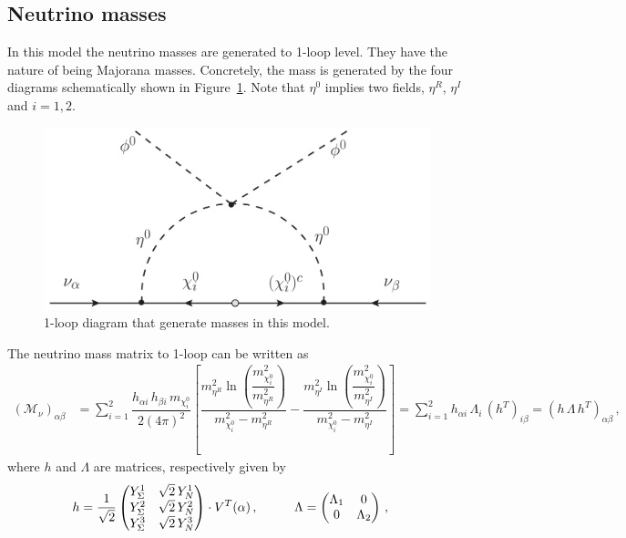 \documentclass[12pt,letterpaper]{article}
\begin{document}
   






\subsection{Neutrino masses}
\label{sec:neutrino-masses}

In this model the neutrino masses are generated to 1-loop level. They have the nature of being Majorana masses. Concretely, the mass is generated by the four diagrams schematically shown in Figure~\ref{fig:mass-diagram}. Note that $\eta^0$ implies two fields, $\eta^R$, $\eta^I$ and $i=1,2$.
%
\begin{figure}
\begin{center}
\includegraphics[scale=0.4]{mass-diagram}
\caption{1-loop diagram that generate masses in this model. }
\label{fig:mass-diagram}
\end{center}
\end{figure}
%
The neutrino mass matrix to 1-loop can be written as
%
\begin{align}
\label{eq:Mv-mass-matrix}
(\mathcal{M}_\nu)_{\alpha\beta} &= \sum_{i=1}^2\dfrac{h_{\alpha i}\,h_{\beta i}\,m_{\chi_i^0}}{2(4\pi)^2}
\left[
\dfrac{m_{\eta^R}^2\ln\left(\dfrac{m_{\chi_i^0}^2}{m_{\eta^R}^2}\right)}{m_{\chi_i^0}^2-m_{\eta^R}^2}
-\dfrac{m_{\eta^I}^2\ln\left(\dfrac{m_{\chi_i^0}^2}{m_{\eta^I}^2}\right)}{m_{\chi_i^0}^2-m_{\eta^I}^2}
\right] = \sum_{i=1}^2h_{\alpha i}\,\Lambda_i\,(h^T)_{i\beta}
=(h\,\Lambda\,h^T)_{\alpha\beta}\,,
\end{align}
%
where $h$ and $\Lambda$ are matrices, respectively given by
%
\begin{align}
\label{eq:h-Lambda-matrices}
h &= \dfrac{1}{\sqrt{2}}
\begin{pmatrix}
Y_{\Sigma}^1 & \sqrt{2}\,Y_N^1 \\
Y_{\Sigma}^2 & \sqrt{2}\,Y_N^2 \\
Y_{\Sigma}^3 & \sqrt{2}\,Y_N^3
\end{pmatrix}
\cdot V^{T}(\alpha)\,,
\hspace{1 cm}
\Lambda=
\begin{pmatrix}
\Lambda_1 & 0 \\
0 & \Lambda_2
\end{pmatrix}\,,
\end{align}
\end{document}
